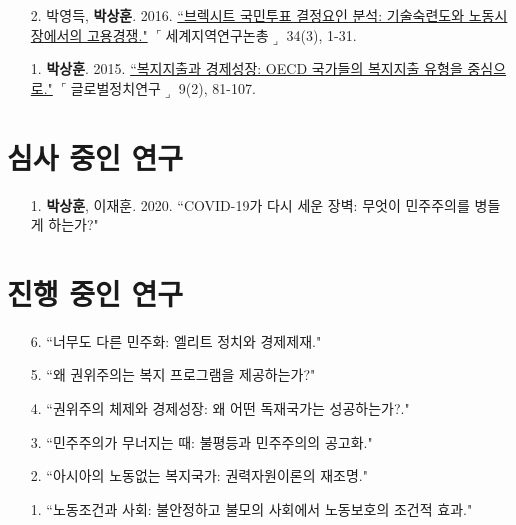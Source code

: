 \documentclass[11pt]{res} %
\begin{document}
\begin{resume}
\begin{enumerate}[leftmargin=*]
	\item[2.] 박영득, \textbf{박상훈}. 2016. \href{http://kiss.kstudy.com/thesis/thesis-view.asp?key=3472800}{``브렉시트 국민투표 결정요인 분석: 기술숙련도와 노동시장에서의 고용경쟁."} $\ulcorner$세계지역연구논총$\lrcorner$ 34(3), 1-31.	
	\item[1.] \textbf{박상훈}. 2015. \href{http://search.koreanstudies.net/thesis/thesis-view.asp?key=3438155}{``복지지출과 경제성장: OECD 국가들의 복지지출 유형을 중심으로."} $\ulcorner$글로벌정치연구$\lrcorner$ 9(2), 81-107.	
\end{enumerate}


\section{심사 중인 연구}
\begin{enumerate}[leftmargin=*]
	\item[1.] \textbf{박상훈}, 이재훈. 2020. ``COVID-19가 다시 세운 장벽: 
	무엇이 민주주의를 병들게 하는가?"
\end{enumerate}

\section{진행 중인 연구}
\begin{enumerate}[leftmargin=*]
	\item[6.] ``너무도 다른 민주화: 엘리트 정치와 경제제재."
	\item[5.] ``왜 권위주의는 복지 프로그램을 제공하는가?"
	\item[4.] ``권위주의 체제와 경제성장: 왜 어떤 독재국가는 성공하는가?."
	\item[3.] ``민주주의가 무너지는 때: 불평등과 민주주의의 공고화."
	\item[2.] ``아시아의 노동없는 복지국가: 권력자원이론의 재조명."
	\item[1.] ``노동조건과 사회: 불안정하고 불모의 사회에서 노동보호의 조건적 효과."
\end{enumerate}


\end{resume}
\end{document}
